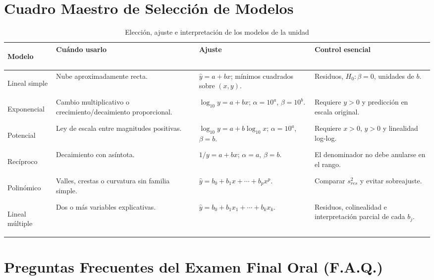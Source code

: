 \documentclass[11pt,a4paper]{article}
\begin{document}
\clearpage
\section{Cuadro Maestro de Selección de Modelos}

\begin{table}[htbp]
\centering
\caption{Elección, ajuste e interpretación de los modelos de la unidad}
\footnotesize
\begin{tabularx}{\linewidth}{>{\bfseries\raggedright\arraybackslash}p{2.25cm}>{\raggedright\arraybackslash}X>{\raggedright\arraybackslash}X>{\raggedright\arraybackslash}X}
\toprule
Modelo & Cuándo usarlo & Ajuste & Control esencial \\
\midrule
Lineal simple & Nube aproximadamente recta. & $\hat y=a+bx$; mínimos cuadrados sobre $(x,y)$. & Residuos, $H_0:\beta=0$, unidades de $b$. \\
Exponencial & Cambio multiplicativo o crecimiento/decaimiento proporcional. & $\log_{10}y=a+bx$; $\alpha=10^a$, $\beta=10^b$. & Requiere $y>0$ y predicción en escala original. \\
Potencial & Ley de escala entre magnitudes positivas. & $\log_{10}y=a+b\log_{10}x$; $\alpha=10^a$, $\beta=b$. & Requiere $x>0$, $y>0$ y linealidad log-log. \\
Recíproco & Decaimiento con asíntota. & $1/y=a+bx$; $\alpha=a$, $\beta=b$. & El denominador no debe anularse en el rango. \\
Polinómico & Valles, crestas o curvatura sin familia simple. & $\hat y=b_0+b_1x+\cdots+b_px^p$. & Comparar $s^2_{res}$ y evitar sobreajuste. \\
Lineal múltiple & Dos o más variables explicativas. & $\hat y=b_0+b_1x_1+\cdots+b_kx_k$. & Residuos, colinealidad e interpretación parcial de cada $b_j$. \\
\bottomrule
\end{tabularx}
\end{table}

\clearpage
\section{Preguntas Frecuentes del Examen Final Oral (F.A.Q.)}
\end{document}

